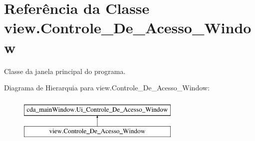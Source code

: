 \hypertarget{classview_1_1Controle__De__Acesso__Window}{\section{\-Referência da \-Classe view.\-Controle\-\_\-\-De\-\_\-\-Acesso\-\_\-\-Window}
\label{classview_1_1Controle__De__Acesso__Window}
}


\-Classe da janela principal do programa.  


\-Diagrama de \-Hierarquia para view.\-Controle\-\_\-\-De\-\_\-\-Acesso\-\_\-\-Window\-:\begin{figure}[H]
\begin{center}
\leavevmode
\includegraphics[height=2.000000cm]{classview_1_1Controle__De__Acesso__Window}
\end{center}
\end{figure}
